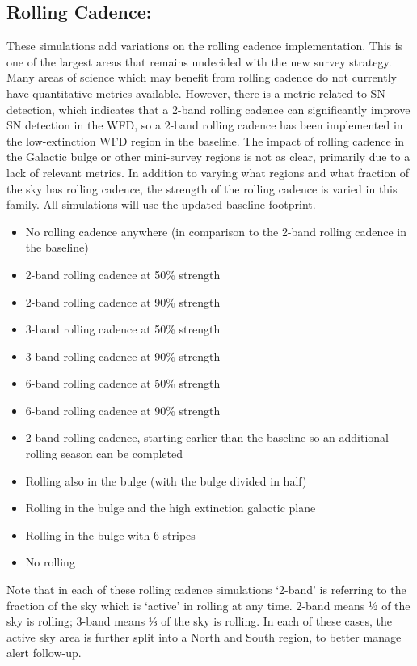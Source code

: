\subsection{Rolling Cadence:}
These simulations add variations on the rolling cadence implementation. This is one of the largest areas that remains undecided with the new survey strategy. Many areas of science which may benefit from rolling cadence do not currently have quantitative metrics available. However, there is a metric related to SN detection, which indicates that a 2-band rolling cadence can significantly improve SN detection in the WFD, so a 2-band rolling cadence has been implemented in the low-extinction WFD region in the baseline. The impact of rolling cadence in the Galactic bulge or other mini-survey regions is not as clear, primarily due to a lack of relevant metrics. In addition to varying what regions and what fraction of the sky has rolling cadence, the strength of the rolling cadence is varied in this family. All simulations will use the updated baseline footprint. 
\begin{itemize}
\item No rolling cadence anywhere (in comparison to the 2-band rolling cadence in the baseline) %
\item 2-band rolling cadence at 50\% strength %
\item 2-band rolling cadence at 90\% strength %
\item 3-band rolling cadence at 50\% strength %
\item 3-band rolling cadence at 90\% strength %
\item 6-band rolling cadence at 50\% strength %
\item 6-band rolling cadence at 90\% strength %
\item 2-band rolling cadence, starting earlier than the baseline so an additional rolling season can be completed %
\item Rolling also in the bulge (with the bulge divided in half) %
\item Rolling in the bulge and the high extinction galactic plane %
\item Rolling in the bulge with 6 stripes %
\item No rolling
\end{itemize}
Note that in each of these rolling cadence simulations ‘2-band’ is referring to the fraction of the sky which is ‘active’ in rolling at any time. 2-band means ½ of the sky is rolling; 3-band means ⅓ of the sky is rolling. In each of these cases, the active sky area is further split into a North and South region, to better manage alert follow-up. 

